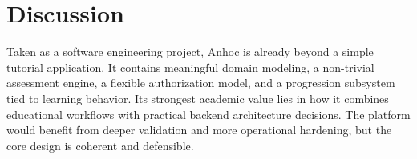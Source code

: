 \section{Discussion}

Taken as a software engineering project, Anhoc is already beyond a simple tutorial application. It contains meaningful domain modeling, a non-trivial assessment engine, a flexible authorization model, and a progression subsystem tied to learning behavior. Its strongest academic value lies in how it combines educational workflows with practical backend architecture decisions. The platform would benefit from deeper validation and more operational hardening, but the core design is coherent and defensible.
